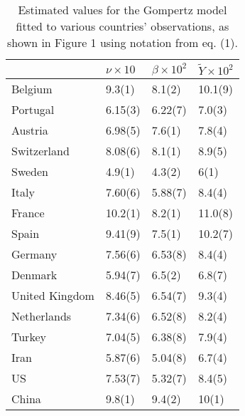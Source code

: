 \documentclass{article}
\begin{document}
\begin{table}
\label{tab:gomp}
\centering
\caption{Estimated values for the Gompertz model fitted to various countries' observations, as shown in Figure 1 using notation from eq. (1).}
\begin{tabular}{llll}
\toprule
{} &             $\nu\times 10$ &           $\beta\times 10^{2}$ &        $\tilde{Y}\times 10^{2}$ \\
\midrule
Belgium        &   9.3(1) &   8.1(2) &  10.1(9) \\
Portugal       &  6.15(3) &  6.22(7) &   7.0(3) \\
Austria        &  6.98(5) &   7.6(1) &   7.8(4) \\
Switzerland    &  8.08(6) &   8.1(1) &   8.9(5) \\
Sweden         &   4.9(1) &   4.3(2) &     6(1) \\
Italy          &  7.60(6) &  5.88(7) &   8.4(4) \\
France         &  10.2(1) &   8.2(1) &  11.0(8) \\
Spain          &  9.41(9) &   7.5(1) &  10.2(7) \\
Germany        &  7.56(6) &  6.53(8) &   8.4(4) \\
Denmark        &  5.94(7) &   6.5(2) &   6.8(7) \\
United Kingdom &  8.46(5) &  6.54(7) &   9.3(4) \\
Netherlands    &  7.34(6) &  6.52(8) &   8.2(4) \\
Turkey         &  7.04(5) &  6.38(8) &   7.9(4) \\
Iran           &  5.87(6) &  5.04(8) &   6.7(4) \\
US             &  7.53(7) &  5.32(7) &   8.4(5) \\
China          &   9.8(1) &   9.4(2) &    10(1) \\
\bottomrule
\end{tabular}

\end{table}




\end{document}

